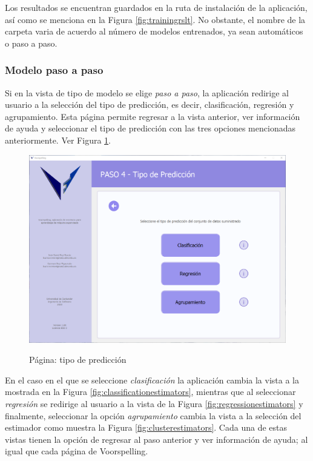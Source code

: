 Los resultados se encuentran guardados en la ruta de instalación de la aplicación, así como se menciona en la Figura \ref{fig:trainingrslt}. No obstante, el nombre de la carpeta varia de acuerdo al número de modelos entrenados, ya sean automáticos o paso a paso.

\subsubsection{Modelo paso a paso}

Si en la vista de tipo de modelo se elige \textit{paso a paso}, la aplicación redirige al usuario a la selección del tipo de predicción, es decir, clasificación, regresión y agrupamiento. Esta página permite regresar a la vista anterior, ver información de ayuda y seleccionar el tipo de predicción con las tres opciones mencionadas anteriormente. Ver Figura \ref{fig:predictiontype}.

\begin{figure}[H]
    \centering
    \caption{Página: tipo de predicción}
    \includegraphics[width=\textwidth]{views/prediction_type.png}
    \label{fig:predictiontype}
\end{figure}



En el caso en el que se seleccione \textit{clasificación} la aplicación cambia la vista a la mostrada en la Figura \ref{fig:classificationestimators}, mientras que al seleccionar \textit{regresión} se redirige al usuario a la vista de la Figura \ref{fig:regressionestimators} y finalmente, seleccionar la opción \textit{agrupamiento} cambia la vista a la selección del estimador como muestra la Figura \ref{fig:clusterestimators}. Cada una de estas vistas tienen la opción de regresar al paso anterior y ver información de ayuda; al igual que cada página de Voorspelling.

